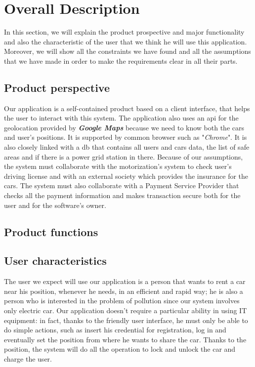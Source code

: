 \section{Overall Description} \label{sec:description}
In this section, we will explain the product prospective and major functionality and also the characteristic of the user that we think he will use this application. Moreover, we will show all the constraints we have found and all the assumptions that we have made in order to make the requirements clear in all their parts. 

\subsection{Product perspective} \label{subsec:prod_persp}
Our application is a self-contained product based on a client interface, that helps the user to interact with this system. The application also uses an \acs{api} for the geolocation provided by \emph{\textbf{Google Maps}} because we need to know both the cars and user's positions. It is supported by common browser such as "\emph{Chrome}". It is also closely linked with a \acs{db} that contains all users and cars data, the list of safe areas and if there is a power grid station in there. Because of our assumptions, the system must collaborate with the motorization's system to check user's driving license and with an external society which provides the  insurance for the cars. The system must also collaborate with a Payment Service Provider that checks all the payment information and makes transaction secure both for the user and for the software's owner.



\subsection{Product functions} \label{subsec:prod_funct}


\subsection{User characteristics} \label{subsec:user_char}
The user we expect will use our application is a person that wants to rent a car near his position, whenever he needs, in an efficient and rapid way; he is also a person who is interested in the problem of pollution since our system involves only electric car. Our application doesn't require a particular ability in using IT equipment: in fact, thanks to the friendly user interface, he must only be able to do simple actions, such as insert his credential for registration, log in and eventually set the position from where he wants to share the car. Thanks to the position, the system will do all the operation to lock and unlock the car and charge the user.


